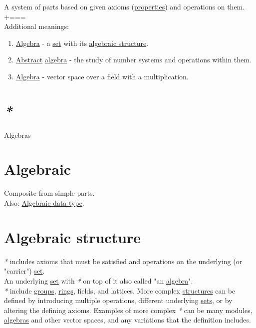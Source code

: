 \documentclass[a4paper,14pt,oneside]{book}
\newcommand{\additional}{{\scriptsize +===}}    %
\begin{document}
A system of parts based on given axioms (\hyperref[org533778b]{properties}) and operations on them.\\


\additional\\

Additional meanings:\\

\begin{enumerate}
\item \hyperref[orge09d4c0]{Algebra} - a \hyperref[org6f8bfa6]{set} with its \hyperref[orgd7c2af9]{algebraic structure}.\\
\item \hyperref[orgee361eb]{Abstract} \hyperref[orge09d4c0]{algebra} - the study of number systems and operations within them.\\
\item \hyperref[orge09d4c0]{Algebra} - vector space over a field with a multiplication.\\
\end{enumerate}

\section{\emph{*}}
\label{sec:org4251aa8}

\label{orge977eed}Algebras\\

\section{\label{org89ba5de}Algebraic}
\label{sec:org9c4e194}
Composite from simple parts.\\

Also: \hyperref[org5f669a9]{Algebraic data type}.\\

\section{\label{orgd7c2af9}Algebraic structure}
\label{sec:org32fcd23}
\emph{*} includes axioms that must be satisfied and operations on the underlying (or "carrier") \hyperref[org6f8bfa6]{set}.\\

An underlying \hyperref[org6f8bfa6]{set} with \emph{*} on top of it also called "an \hyperref[orge09d4c0]{algebra}".\\

\emph{*} include \hyperref[orgbeb39dc]{groups}, \hyperref[org32ed82f]{rings}, fields, and lattices. More complex \hyperref[org99c5c2f]{structures} can be defined by introducing multiple operations, different underlying \hyperref[org05b305d]{sets}, or by altering the defining axioms. Examples of more complex \emph{*} can be many modules, \hyperref[orge977eed]{algebras} and other vector spaces, and any variations that the definition includes.\\
\end{document}

